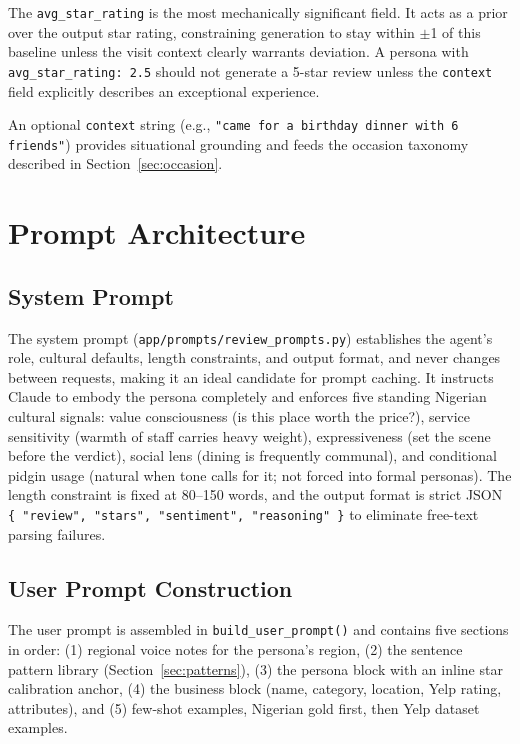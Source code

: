 \documentclass[11pt]{article}
\begin{document}
The \texttt{avg\_star\_rating} is the most mechanically significant field. It acts as a prior over the output star rating, constraining generation to stay within $\pm$1 of this baseline unless the visit context clearly warrants deviation. A persona with \texttt{avg\_star\_rating: 2.5} should not generate a 5-star review unless the \texttt{context} field explicitly describes an exceptional experience.

An optional \texttt{context} string (e.g., \texttt{"came for a birthday dinner with 6 friends"}) provides situational grounding and feeds the occasion taxonomy described in Section~\ref{sec:occasion}.

\section{Prompt Architecture}

\subsection{System Prompt}

The system prompt (\texttt{app/prompts/review\_prompts.py}) establishes the agent's role, cultural defaults, length constraints, and output format, and never changes between requests, making it an ideal candidate for prompt caching. It instructs Claude to embody the persona completely and enforces five standing Nigerian cultural signals: value consciousness (is this place worth the price?), service sensitivity (warmth of staff carries heavy weight), expressiveness (set the scene before the verdict), social lens (dining is frequently communal), and conditional pidgin usage (natural when tone calls for it; not forced into formal personas). The length constraint is fixed at 80–150 words, and the output format is strict JSON \texttt{\{ "review", "stars", "sentiment", "reasoning" \}} to eliminate free-text parsing failures.

\subsection{User Prompt Construction}

The user prompt is assembled in \texttt{build\_user\_prompt()} and contains five sections in order: (1) regional voice notes for the persona's region, (2) the sentence pattern library (Section~\ref{sec:patterns}), (3) the persona block with an inline star calibration anchor, (4) the business block (name, category, location, Yelp rating, attributes), and (5) few-shot examples, Nigerian gold first, then Yelp dataset examples.
\end{document}
